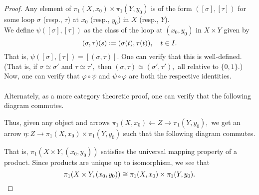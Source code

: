 \documentclass[12pt]{article}
\theoremstyle{definition}
\numberwithin{thm}{section}
\begin{document}
\begin{proof}
	Any element of $\pi_1(X, x_0) \times \pi_1(Y, y_0)$ is of the form $([\sigma], [\tau])$ for some loop $\sigma$ (resp., $\tau$) at $x_0$ (resp., $y_0$) in $X$ (resp., $Y$).\\
	We define $\psi([\sigma], [\tau])$ as the class of the loop at $(x_0, y_0)$ in $X \times Y$ given by
	\begin{equation*} 
		(\sigma, \tau)(s) \vcentcolon= (\sigma(t), \tau(t)), \quad t \in I.
	\end{equation*}
	That is, $\psi([\sigma], [\tau]) = [(\sigma, \tau)].$ One can verify that this is well-defined.\\
	(That is, if $\sigma \simeq \sigma'$ and $\tau \simeq \tau',$ then $(\sigma, \tau) \simeq (\sigma', \tau'),$ all relative to $\{0, 1\}.$)\\
	Now, one can verify that $\varphi\circ\psi$ and $\psi\circ\varphi$ are both the respective identities. \\~\\
	Alternately, as a more category theoretic proof, one can verify that the following diagram commutes.
	\begin{center}
	\end{center}
	Thus, given any object and arrows $\pi_1(X, x_0) \longleftarrow Z \longrightarrow \pi_1(Y, y_0),$ we get an arrow $\eta:Z \longrightarrow \pi_1(X, x_0) \times \pi_1(Y, y_0)$ such that the following diagram commutes.
	\begin{center}
	\end{center}
	That is, $\pi_1(X \times Y, (x_0, y_0))$ satisfies the universal mapping property of a product. Since products are unique up to isomorphism, we see that
	\begin{equation*} 
		\pi_1(X \times Y, (x_0, y_0)) \cong \pi_1(X, x_0) \times \pi_1(Y, y_0). \qedhere
	\end{equation*}
\end{proof}
\end{document}

